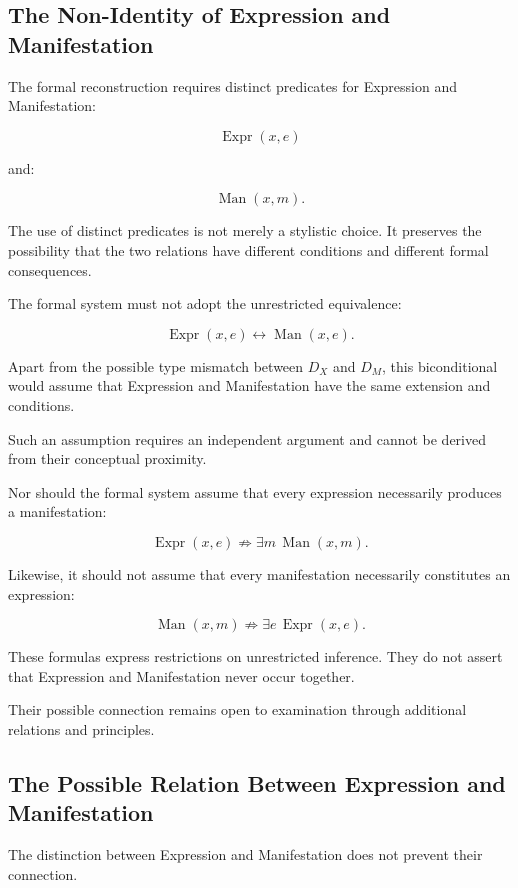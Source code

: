 \subsection{The Non-Identity of Expression and Manifestation}

The formal reconstruction requires
distinct predicates for Expression
and Manifestation:

\[
    \operatorname{Expr}(x,e)
\]

and:

\[
    \operatorname{Man}(x,m).
\]

The use of distinct predicates is
not merely a stylistic choice.
It preserves the possibility that
the two relations have different
conditions and different formal
consequences.

The formal system must not adopt
the unrestricted equivalence:

\[
    \operatorname{Expr}(x,e)
    \leftrightarrow
    \operatorname{Man}(x,e).
\]

Apart from the possible type mismatch
between \(D_X\) and \(D_M\), this
biconditional would assume that
Expression and Manifestation have
the same extension and conditions.

Such an assumption requires an
independent argument and cannot
be derived from their conceptual
proximity.

Nor should the formal system
assume that every expression
necessarily produces a manifestation:

\[
    \operatorname{Expr}(x,e)
    \not\Rightarrow
    \exists m\,
    \operatorname{Man}(x,m).
\]

Likewise, it should not assume
that every manifestation necessarily
constitutes an expression:

\[
    \operatorname{Man}(x,m)
    \not\Rightarrow
    \exists e\,
    \operatorname{Expr}(x,e).
\]

These formulas express restrictions
on unrestricted inference. They
do not assert that Expression
and Manifestation never occur
together.

Their possible connection remains
open to examination through
additional relations and principles.

\subsection{The Possible Relation Between Expression and Manifestation}

The distinction between Expression
and Manifestation does not prevent
their connection.

